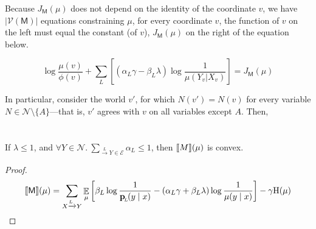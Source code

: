 \documentclass{article}
\newcommand{\bp}[1][L]{\mat{p}_{\!_#1\!}}
\newcommand{\V}{\mathcal V}
\newcommand{\N}{\mathcal N}
\newcommand{\Ed}{\mathcal E}
\newcommand{\sfM}{\mathsf M}
\begin{document}
	
	Because $J_\sfM(\mu)$ does not depend on the identity of the coordinate $v$, we have $|\V(\sfM)|$ equations constraining $\mu$, for every coordinate $v$, the function of $v$ on the left must equal the constant (of $v$), $J_\sfM(\mu)$ on the right of the equation below.
		
	\[  \log\frac{\mu(v)}{\phi(v)} + \sum_L\left[ (\alpha_L \gamma - \beta_L \lambda ) \log \frac{1}{\mu(Y_v | X_v)} \right] = J_\sfM(\mu) \]
	
	In particular, consider the world $v'$, for which $N(v') = N(v)$ for every variable $N \in \N \setminus \{A\}$---that is, $v'$ agrees with $v$ on all variables except $A$. Then,
	
	\section{}
	\begin{prop}
		If $\lambda \leq 1$, and
		$\displaystyle \forall Y \in \N. ~\sum_{ \xrightarrow{\!\!L} Y  \in \Ed } \alpha_L\leq 1$, then
		$\llbracket M\rrbracket(\mu)$ is convex.
	\end{prop}
	\begin{proof}
		\begin{align*}
			\bbr{\sfM}(\mu) &= \sum_{ X \xrightarrow{\!\!L} Y} \E_\mu  \left[
			\beta_L \log \frac{1}{\bp(y\mid x)} - (\alpha_L\gamma + \beta_L \lambda) \log \frac{1}{\mu(y \mid x)} \right] - \gamma \H(\mu) \\
		\end{align*}
		
	\end{proof}
	
	

	
\end{document}
